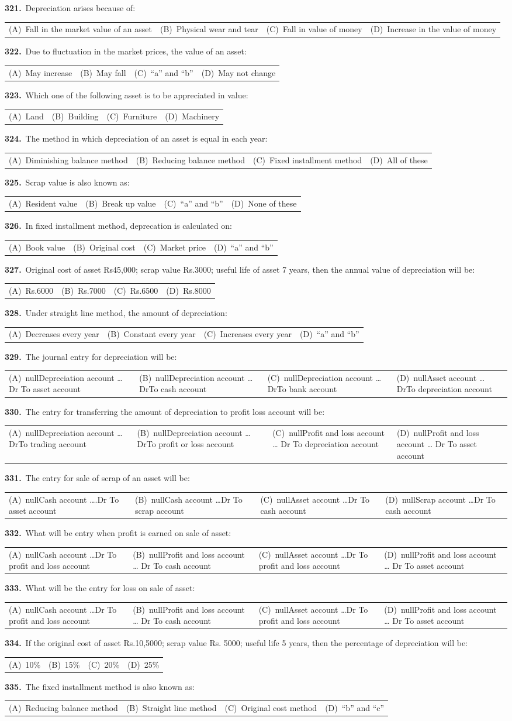 \documentclass[11pt,a4paper]{article}
\makeatletter
\newcommand{\mcq}[6]{%
  \Needspace{4\baselineskip}%
  \par\medskip\noindent\textbf{#1.}\ #2\par\nopagebreak
  \noindent\begin{tabularx}{\linewidth}{@{\hspace{1.5em}}*{4}{>{\raggedright\arraybackslash}X}@{}}
    (A)~#3 & (B)~#4 & (C)~#5 & (D)~#6
  \end{tabularx}\par}
\makeatother
\begin{document}
\mcq{321}{Depreciation arises because of:}{Fall in the market value of an asset}{Physical wear and tear}{Fall in value of money}{Increase in the value of money}
\mcq{322}{Due to fluctuation in the market prices, the value of an asset:}{May increase}{May fall}{“a” and “b”}{May not change}
\mcq{323}{Which one of the following asset is to be appreciated in value:}{Land}{Building}{Furniture}{Machinery}
\mcq{324}{The method in which depreciation of an asset is equal in each year:}{Diminishing balance method}{Reducing balance method}{Fixed installment method}{All of these}
\mcq{325}{Scrap value is also known as:}{Resident value}{Break up value}{“a” and “b”}{None of these}
\mcq{326}{In fixed installment method, deprecation is calculated on:}{Book value}{Original cost}{Market price}{“a” and “b”}
\mcq{327}{Original cost of asset Rs45,000; scrap value Rs.3000; useful life of asset 7 years, then the annual value of depreciation will be:}{Rs.6000}{Rs.7000}{Rs.6500}{Rs.8000}
\mcq{328}{Under straight line method, the amount of depreciation:}{Decreases every year}{Constant every year}{Increases every year}{“a” and “b”}
\mcq{329}{The journal entry for depreciation will be:}{nullDepreciation account …Dr To asset account}{nullDepreciation account …DrTo cash account}{nullDepreciation account …DrTo bank account}{nullAsset account …DrTo depreciation account}
\mcq{330}{The entry for transferring the amount of depreciation to profit loss account will be:}{nullDepreciation account …DrTo trading account}{nullDepreciation account …DrTo profit or loss account}{nullProfit and loss account … Dr To depreciation account}{nullProfit and loss account … Dr To asset account}
\mcq{331}{The entry for sale of scrap of an asset will be:}{nullCash account ….Dr To asset account}{nullCash account …Dr To scrap account}{nullAsset account …Dr To cash account}{nullScrap account …Dr To cash account}
\mcq{332}{What will be entry when profit is earned on sale of asset:}{nullCash account …Dr To profit and loss account}{nullProfit and loss account … Dr To cash account}{nullAsset account …Dr To profit and loss account}{nullProfit and loss account … Dr To asset account}
\mcq{333}{What will be the entry for loss on sale of asset:}{nullCash account …Dr To profit and loss account}{nullProfit and loss account … Dr To cash account}{nullAsset account …Dr To profit and loss account}{nullProfit and loss account … Dr To asset account}
\mcq{334}{If the original cost of asset Rs.10,5000; scrap value Rs. 5000; useful life 5 years, then the percentage of depreciation will be:}{10\%}{15\%}{20\%}{25\%}
\mcq{335}{The fixed installment method is also known as:}{Reducing balance method}{Straight line method}{Original cost method}{“b” and “c”}
\end{document}
